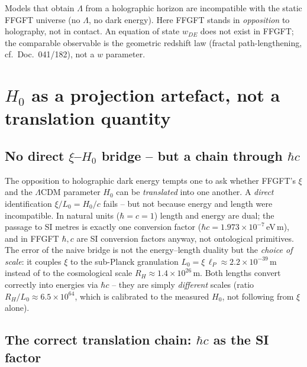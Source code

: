 Models that obtain $\Lambda$ from a holographic horizon are incompatible with
the static FFGFT universe (no $\Lambda$, no dark energy). Here FFGFT stands in
\emph{opposition} to holography, not in contact. An equation of state
$w_{DE}$ does not exist in FFGFT; the comparable observable is the geometric
redshift law (fractal path-lengthening, cf.\ Doc.~041/182), not a
$w$ parameter.

\section{\texorpdfstring{$H_0$ as a projection artefact, not a translation quantity}{H0 as a projection artefact, not a translation quantity}}

\subsection*{No direct \texorpdfstring{$\xi$}{xi}--\texorpdfstring{$H_0$}{H0} bridge -- but a chain through \texorpdfstring{$\hbar c$}{hbar c}}

The opposition to holographic dark energy tempts one to ask whether FFGFT's
$\xi$ and the $\Lambda$CDM parameter $H_0$ can be \emph{translated} into one
another. A \emph{direct} identification $\xi/L_0 = H_0/c$ fails -- but not
because energy and length were incompatible. In natural units ($\hbar = c =
1$) length and energy are dual; the passage to SI metres is exactly one
conversion factor ($\hbar c = 1.973\times10^{-7}$\,eV\,m), and in FFGFT
$\hbar, c$ are SI conversion factors anyway, not ontological primitives. The
error of the naive bridge is not the energy--length duality but the
\emph{choice of scale}: it couples $\xi$ to the sub-Planck granulation
$L_0 = \xi\,\ell_P \approx 2.2\times10^{-39}$\,m instead of to the cosmological
scale $R_H \approx 1.4\times10^{26}$\,m. Both lengths convert correctly into
energies via $\hbar c$ -- they are simply \emph{different} scales (ratio
$R_H/L_0 \approx 6.5\times10^{64}$, which is calibrated to the measured $H_0$, not following from $\xi$ alone).

\subsection*{The correct translation chain: $\hbar c$ as the SI factor}

